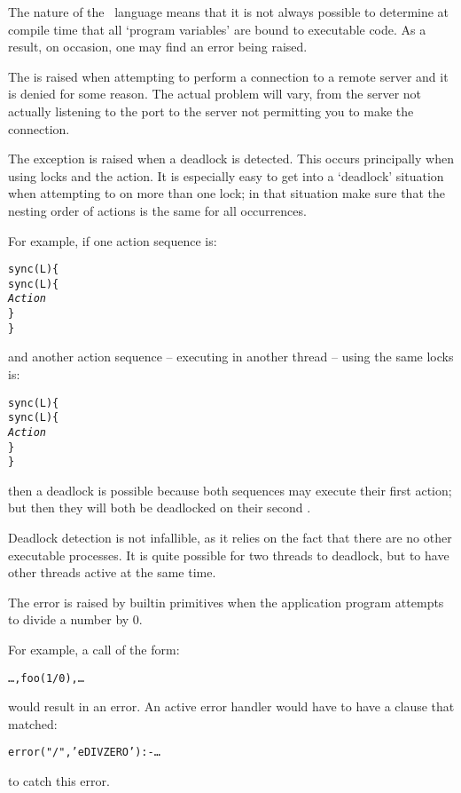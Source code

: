 \begin{description}
The nature of the \go\ language means that it is not always possible to determine at compile time that all `program variables' are bound to executable code. As a result, on occasion, one may find an  error being raised.

\item[\constant{'eCONNECT'}]
\label{eCONNECT}
  
The  is raised when attempting to perform a connection to a remote server and it is denied for some reason. The actual problem will vary, from the server not actually listening to the port to the server not permitting you to make the connection.
  
\item[\constant{'eDEAD'}]
\label{eDEAD}

The  exception is raised when a deadlock is detected. This occurs principally when using locks and the  action. It is especially easy to get into a `deadlock' situation when attempting to  on more than one lock; in that situation make sure that the nesting order of  actions is the same for all occurrences.

For example, if one action sequence is:
\begin{alltt}
sync(L)\{
  sync(L)\{
    \emph{Action}
  \}
\}
\end{alltt}
and another action sequence -- executing in another thread -- using the same locks is:
\begin{alltt}
sync(L)\{
  sync(L)\{
    \emph{Action}
  \}
\}
\end{alltt}
then a deadlock is possible because both sequences may execute their first  action; but then they will both be deadlocked on their second .

Deadlock detection is not infallible, as it relies on the fact that there are no other executable processes. It is quite possible for two threads to deadlock, but to have other threads active at the same time.

\item[\constant{'eDIVZERO'}]
\label{eDIVZERO}
  
The  error is raised by builtin primitives when the application program attempts to divide a number by 0.
  
For example, a call of the form:
\begin{alltt}
\ldots,foo(1/0),\ldots
\end{alltt}
would result in an  error. An active error handler would have to have a clause that matched:
\begin{alltt}
error("/",'eDIVZERO') :- \ldots
\end{alltt}
to catch this error.


\end{description}
